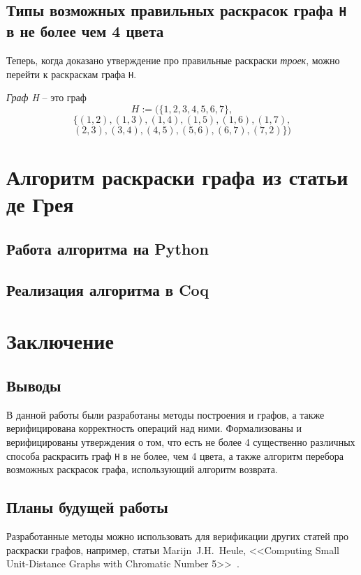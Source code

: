 \section{Типы возможных правильных раскрасок графа {\tt H} в не более чем 4 цвета}

Теперь, когда доказано утверждение про правильные раскраски {\it троек}, можно перейти к раскраскам графа {\tt H}.

{\it Граф H} -- это граф $$H := (\{1, 2, 3, 4, 5, 6, 7 \},$$
    $$ \{(1, 2), (1, 3), (1, 4), (1, 5), (1, 6), (1, 7), $$
    $$ (2, 3), (3, 4), (4, 5), (5, 6), (6, 7), (7, 2)\}) $$

\chapter{Алгоритм раскраски графа из статьи де Грея}

\section{Работа алгоритма на Python}
\section{Реализация алгоритма в Coq}
\label{chapt1}





\chapter{Заключение}

\section{Выводы}
В данной работы были разработаны методы построения и графов, а также верифицирована корректность операций над ними. Формализованы и верифицированы утверждения о том, что есть не более 4 существенно различных способа раскрасить граф {\tt H} в не более, чем 4 цвета, а также алгоритм перебора возможных раскрасок графа, использующий алгоритм возврата.

\section{Планы будущей работы}
Разработанные методы можно использовать для верификации других статей про раскраски графов, например, статьи Marijn~J.H.~Heule, <<Computing Small Unit-Distance Graphs with Chromatic Number 5>>~\cite{Huele}.

